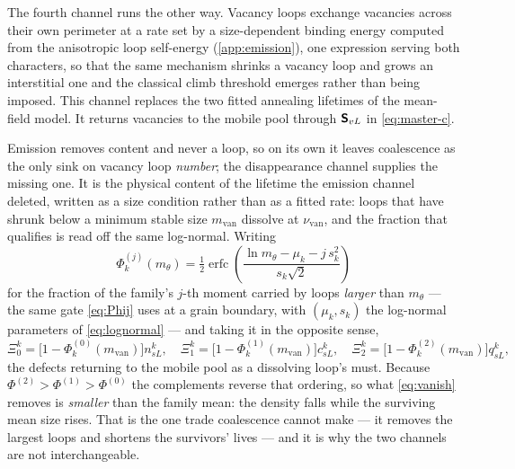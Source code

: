 The fourth channel runs the other way. Vacancy loops exchange vacancies across their own
perimeter at a rate set by a size-dependent binding energy computed from the
anisotropic loop self-energy (\cref{app:emission}), one expression serving both
characters, so that the same mechanism shrinks a vacancy loop and grows an
interstitial one and the classical climb threshold emerges rather than being
imposed. This channel replaces the two fitted annealing lifetimes of the
mean-field model. It returns vacancies to the mobile pool through $\bm{\mathsf{S}}_{vL}$
in \cref{eq:master-c}.

Emission removes content and never a loop, so on its own it leaves coalescence
as the only sink on vacancy loop \emph{number}; the disappearance channel
supplies the missing one. It is the physical content of the lifetime the
emission channel deleted, written as a size condition rather than as a fitted
rate: loops that have shrunk below a minimum stable size $m_{\mathrm{van}}$
dissolve at $\nu_{\mathrm{van}}$, and the fraction that qualifies is read off
the same log-normal. Writing
\[
  \Phi^{(j)}_k(m_\theta)
  =\tfrac12\operatorname{erfc}\!\left(
     \frac{\ln m_\theta-\mu_k-j\,s_k^{2}}{s_k\sqrt2}\right)
\]
for the fraction of the family's $j$-th moment carried by loops \emph{larger}
than $m_\theta$ --- the same gate \cref{eq:Phij} uses at a grain boundary, with
$(\mu_k,s_k)$ the log-normal parameters of \cref{eq:lognormal} --- and taking it
in the opposite sense,
\begin{equation}
  \Xi^k_0=\bigl[1-\Phi^{(0)}_k(m_{\mathrm{van}})\bigr]n^k_{sL},
  \quad
  \Xi^k_1=\bigl[1-\Phi^{(1)}_k(m_{\mathrm{van}})\bigr]c^k_{sL},
  \quad
  \Xi^k_2=\bigl[1-\Phi^{(2)}_k(m_{\mathrm{van}})\bigr]q^k_{sL},
  \label{eq:vanish}
\end{equation}
the defects returning to the mobile pool as a dissolving loop's must. Because
$\Phi^{(2)}>\Phi^{(1)}>\Phi^{(0)}$ the complements reverse that ordering, so
what \cref{eq:vanish} removes is \emph{smaller} than the family mean: the
density falls while the surviving mean size rises. That is the one trade
coalescence cannot make --- it removes the largest loops and shortens the
survivors' lives --- and it is why the two channels are not interchangeable.

